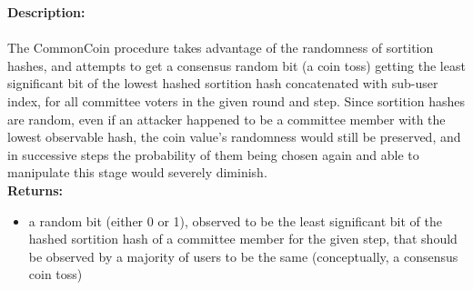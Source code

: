 \documentclass[10pt,a4paper]{article}
\begin{document}
\noindent \textbf{Description:}\\\\
The CommonCoin procedure takes advantage of the randomness of sortition hashes, and attempts to
get a consensus random bit (a coin toss) getting the least significant bit of the lowest hashed
sortition hash concatenated with sub-user index, for all committee voters in the given round and step.
Since sortition hashes are random, even if an attacker happened to be a committee member with the lowest observable hash,
the coin value's randomness would still be preserved, and in successive steps the probability of them being chosen again and
able to manipulate this stage would severely diminish.\\

\noindent \textbf{Returns:}
\begin{itemize}
    \item a random bit (either 0 or 1), observed to be the least significant bit of the hashed sortition hash of a committee member for the given step,
    that should be observed by a majority of users to be the same (conceptually, a consensus coin toss)
  \end{itemize}
\end{document}
